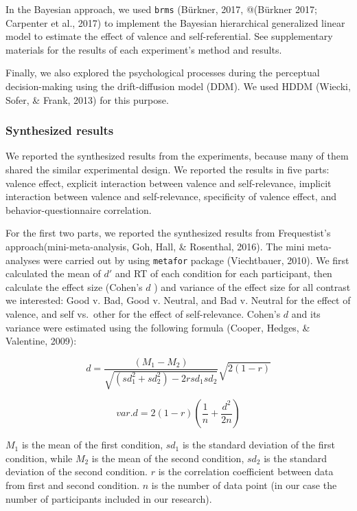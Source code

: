 \documentclass[
  english,
  man]{apa6}
\begin{document}
In the Bayesian approach, we used \texttt{brms} (Bürkner, 2017, @(Bürkner 2017; Carpenter et al., 2017) to implement the Bayesian hierarchical generalized linear model to estimate the effect of valence and self-referential. See supplementary materials for the results of each experiment's method and results.

Finally, we also explored the psychological processes during the perceptual decision-making using the drift-diffusion model (DDM). We used HDDM (Wiecki, Sofer, \& Frank, 2013) for this purpose.

\hypertarget{synthesized-results}{%
\subsubsection{Synthesized results}\label{synthesized-results}}

We reported the synthesized results from the experiments, because many of them shared the similar experimental design. We reported the results in five parts: valence effect, explicit interaction between valence and self-relevance, implicit interaction between valence and self-relevance, specificity of valence effect, and behavior-questionnaire correlation.

For the first two parts, we reported the synthesized results from Frequestist's approach(mini-meta-analysis, Goh, Hall, \& Rosenthal, 2016). The mini meta-analyses were carried out by using \texttt{metafor} package (Viechtbauer, 2010). We first calculated the mean of \(d'\) and RT of each condition for each participant, then calculate the effect size (Cohen's \(d\) ) and variance of the effect size for all contrast we interested: Good v. Bad, Good v. Neutral, and Bad v. Neutral for the effect of valence, and self vs.~other for the effect of self-relevance. Cohen's \(d\) and its variance were estimated using the following formula (Cooper, Hedges, \& Valentine, 2009):

\[d = \frac {(M_{1} - M_{2})}{\sqrt {(sd_{1}^2 + sd_{2}^2) - 2rsd_{1}sd_{2}}}  \sqrt {2(1-r)}\]

\[var.d = 2 (1-r)  (\frac{1}{n} + \frac{d^2}{2n})\]

\(M_1\) is the mean of the first condition, \(sd_1\) is the standard deviation of the first condition, while \(M_2\) is the mean of the second condition, \(sd_2\) is the standard deviation of the second condition. \(r\) is the correlation coefficient between data from first and second condition. \(n\) is the number of data point (in our case the number of participants included in our research).
\end{document}
